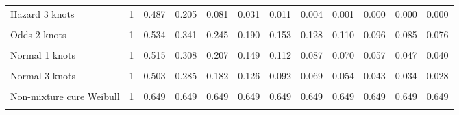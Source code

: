 \documentclass[
]{article}
\begin{document}
\begin{table}[H]
{\begin{tabular}[t]{lrrrrrrrrrrr}
Hazard 3 knots & 1 & 0.487 & 0.205 & 0.081 & 0.031 & 0.011 & 0.004 & 0.001 & 0.000 & 0.000 & 0.000\\
\cellcolor{gray!10}{Odds 1 knots} & \cellcolor{gray!10}{1} & \cellcolor{gray!10}{0.532} & \cellcolor{gray!10}{0.337} & \cellcolor{gray!10}{0.241} & \cellcolor{gray!10}{0.186} & \cellcolor{gray!10}{0.150} & \cellcolor{gray!10}{0.125} & \cellcolor{gray!10}{0.107} & \cellcolor{gray!10}{0.093} & \cellcolor{gray!10}{0.082} & \cellcolor{gray!10}{0.073}\\
Odds 2 knots & 1 & 0.534 & 0.341 & 0.245 & 0.190 & 0.153 & 0.128 & 0.110 & 0.096 & 0.085 & 0.076\\
\cellcolor{gray!10}{Odds 3 knots} & \cellcolor{gray!10}{1} & \cellcolor{gray!10}{0.498} & \cellcolor{gray!10}{0.277} & \cellcolor{gray!10}{0.180} & \cellcolor{gray!10}{0.129} & \cellcolor{gray!10}{0.098} & \cellcolor{gray!10}{0.078} & \cellcolor{gray!10}{0.064} & \cellcolor{gray!10}{0.054} & \cellcolor{gray!10}{0.046} & \cellcolor{gray!10}{0.040}\\
Normal 1 knots & 1 & 0.515 & 0.308 & 0.207 & 0.149 & 0.112 & 0.087 & 0.070 & 0.057 & 0.047 & 0.040\\
\cellcolor{gray!10}{Normal 2 knots} & \cellcolor{gray!10}{1} & \cellcolor{gray!10}{0.538} & \cellcolor{gray!10}{0.350} & \cellcolor{gray!10}{0.253} & \cellcolor{gray!10}{0.194} & \cellcolor{gray!10}{0.154} & \cellcolor{gray!10}{0.126} & \cellcolor{gray!10}{0.106} & \cellcolor{gray!10}{0.090} & \cellcolor{gray!10}{0.077} & \cellcolor{gray!10}{0.067}\\
Normal 3 knots & 1 & 0.503 & 0.285 & 0.182 & 0.126 & 0.092 & 0.069 & 0.054 & 0.043 & 0.034 & 0.028\\
\cellcolor{gray!10}{Mixture cure Weibull} & \cellcolor{gray!10}{1} & \cellcolor{gray!10}{0.652} & \cellcolor{gray!10}{0.652} & \cellcolor{gray!10}{0.652} & \cellcolor{gray!10}{0.652} & \cellcolor{gray!10}{0.652} & \cellcolor{gray!10}{0.652} & \cellcolor{gray!10}{0.652} & \cellcolor{gray!10}{0.652} & \cellcolor{gray!10}{0.652} & \cellcolor{gray!10}{0.652}\\
Non-mixture cure Weibull & 1 & 0.649 & 0.649 & 0.649 & 0.649 & 0.649 & 0.649 & 0.649 & 0.649 & 0.649 & 0.649\\
\cellcolor{gray!10}{Mixture cure Log-normal} & \cellcolor{gray!10}{1} & \cellcolor{gray!10}{0.600} & \cellcolor{gray!10}{0.573} & \cellcolor{gray!10}{0.571} & \cellcolor{gray!10}{0.571} & \cellcolor{gray!10}{0.571} & \cellcolor{gray!10}{0.571} & \cellcolor{gray!10}{0.571} & \cellcolor{gray!10}{0.571} & \cellcolor{gray!10}{0.571} & \cellcolor{gray!10}{0.571}\\

\end{tabular}}
\end{table}
\end{document}

